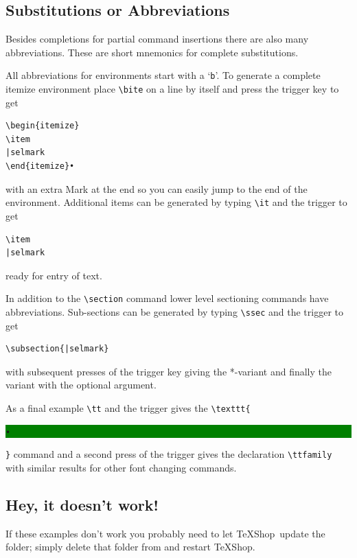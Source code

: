 \documentclass[letterpaper,11pt]{article}
\newcommand{\TS}{\textsf{\TeX Shop}}
\newcommand{\cmd}[1]{\textsf{#1}}
\newcommand{\selmark}{\colorbox{green}{\rule[-0.5ex]{0ex}{2.1ex}\texttt{•}}}
\begin{document}
\subsection{Substitutions or Abbreviations}

Besides completions for partial command insertions there are also many abbreviations. These are short mnemonics for complete substitutions. 

All abbreviations for environments start with a `\texttt{b}'. To generate a complete \cmd{itemize} environment place \verb|\bite| on a line by itself and press the trigger key to get
\begin{verbatim}
\begin{itemize}
\item
|selmark
\end{itemize}•
\end{verbatim}
with an extra Mark at the end so you can easily jump to the end of the environment. Additional items can be generated by typing \verb|\it| and the trigger to get
\begin{verbatim}
\item
|selmark
\end{verbatim}
ready for entry of text.

In addition to the \verb|\section| command lower level sectioning commands have abbreviations. Sub-sections can be generated by typing \verb|\ssec| and the trigger to get
\begin{verbatim}
\subsection{|selmark}
\end{verbatim}
with subsequent presses of the trigger key giving the *-variant and finally the variant with the optional argument.

As a final example \verb|\tt| and the trigger gives the \verb|\texttt{|\selmark\verb|}| command and a second press of the trigger gives the declaration \verb|\ttfamily| with similar results for other font changing commands.

\subsection{Hey, it doesn't work!}

If these examples don't work you probably need to let \TS\ update the  folder; simply delete that folder from  and restart \TS.
\end{document}
